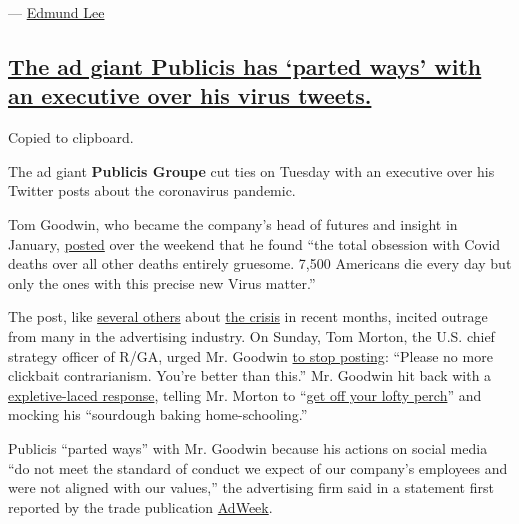 --- \href{https://www.nytimes3xbfgragh.onion/by/edmund-lee}{Edmund Lee}

\hypertarget{the-ad-giant-publicis-has-parted-ways-with-an-executive-over-his-virus-tweets}{%
\subsection{\texorpdfstring{\protect\hyperlink{the-ad-giant-publicis-has-parted-ways-with-an-executive-over-his-virus-tweets}{The
ad giant Publicis has `parted ways' with an executive over his virus
tweets.}}{The ad giant Publicis has `parted ways' with an executive over his virus tweets.}}\label{the-ad-giant-publicis-has-parted-ways-with-an-executive-over-his-virus-tweets}}

Copied to clipboard.

The ad giant \textbf{Publicis Groupe} cut ties on Tuesday with an
executive over his Twitter posts about the coronavirus pandemic.

Tom Goodwin, who became the company's head of futures and insight in
January,
\href{https://twitter.com/tomfgoodwin/status/1289981216335073280?s=20}{posted}
over the weekend that he found ``the total obsession with Covid deaths
over all other deaths entirely gruesome. 7,500 Americans die every day
but only the ones with this precise new Virus matter.''

The post, like
\href{https://twitter.com/tomfgoodwin/status/1251848439035502592?s=20}{several
others} about
\href{https://twitter.com/tomfgoodwin/status/1236483014277894144?s=20}{the
crisis} in recent months, incited outrage from many in the advertising
industry. On Sunday, Tom Morton, the U.S. chief strategy officer of
R/GA, urged Mr. Goodwin
\href{https://twitter.com/tommorton/status/1289992807038332928?s=20}{to
stop posting}: ``Please no more clickbait contrarianism. You're better
than this.'' Mr. Goodwin hit back with a
\href{https://twitter.com/tomfgoodwin/status/1289995369313497090?s=20}{expletive-laced
response}, telling Mr. Morton to
``\href{https://twitter.com/tomfgoodwin/status/1289994688275988481?s=20}{get
off your lofty perch}'' and mocking his ``sourdough baking
home-schooling.''

Publicis ``parted ways'' with Mr. Goodwin because his actions on social
media ``do not meet the standard of conduct we expect of our company's
employees and were not aligned with our values,'' the advertising firm
said in a statement first reported by the trade publication
\href{https://www.adweek.com/agencies/after-coronavirus-tweets-tom-goodwin-is-out-at-publicis-groupe/}{AdWeek}.

